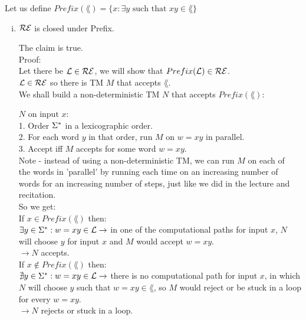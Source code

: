 Let us define $Prefix(\lang) = \{x : \exists y \text{ such that } xy \in \lang\}$

\begin{enumerate}[i.]
    \item $\mathcal{R}\mathcal{E}$ is closed under Prefix.

          The claim is true. \\

          Proof: \\
          Let there be $\mathcal{L} \in \mathcal{R}\mathcal{E}$, we will show that $Prefix(\mathcal{L}) \in \mathcal{R}\mathcal{E}$. \\
          $\mathcal{L} \in \mathcal{R}\mathcal{E}$ so there is TM $M$ that accepts $\lang$. \\
          We shall build a non-deterministic TM $N$ that accepts $Prefix(\lang)$:

          $N \text{ on input } x$: \\
          1. Order $\Sigma^*$ in a lexicographic order. \\
          2. For each word $y$ in that order, run $M$ on $w=xy$ in parallel. \\
          3. Accept iff $M$ accepts for some word $w=xy$. \\

          Note - instead of using a non-deterministic TM, we can run $M$ on each of \\
          the words in 'parallel' by running each time on an increasing number of \\
          words for an increasing number of steps, just like we did in the lecture and recitation. \\

          So we get: \\
          If $x \in Prefix(\lang)$ then: \\
          $\exists y \in \Sigma^*: w=xy \in \mathcal{L} \rightarrow $ in one of the computational
          paths for input $x$, $N$ will choose $y$ for input $x$ and $M$ would accept $w=xy$. \\
          $\rightarrow N$ accepts. \\

          If $x \notin Prefix(\lang)$ then: \\
          $\nexists y \in \Sigma^*: w=xy \in \mathcal{L} \rightarrow $ there is no computational
          path for input $x$, in which $N$ will choose $y$ such that $w=xy \in \lang$,
          so $M$ would reject or be stuck in a loop for every $w=xy$. \\
          $\rightarrow N$ rejects or stuck in a loop. \\


\end{enumerate}
